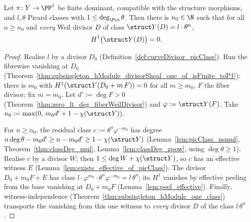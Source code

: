 \begin{theorem}
  \label{thm:flv_class_form}
  \leanok
  Let \(\pi \colon Y \to \PP^1\) be finite dominant, compatible with the structure
  morphisms, and \(l, \theta\) Picard classes with \(1 \le \deg_{\Pic}\theta\). Then there
  is \(n_0 \in \N\) such that for all \(n \ge n_0\) and \emph{every} Weil divisor \(D\) of
  class \(\struct Y(D) = l \cdot \theta^{n}\),
  \[
    H^1\bigl(\struct Y(D)\bigr) = 0 .
  \]
\end{theorem}
\begin{proof}
  \leanok
  Realise \(l\) by a divisor \(D_0\) (Definition~\ref{def:curveDivisor_picClass}). Run the
  fibrewise vanishing at \(D_0\)
  (Theorem~\ref{thm:subsingleton_hModule_divisorSheaf_one_of_isFinite_toP1}): there is
  \(m_0\) with \(H^1(\struct Y(D_0 + m\,F)) = 0\) for all \(m \ge m_0\), \(F\) the fiber
  divisor; fix \(m = m_0\). Let \(d' := \deg F > 0\)
  (Theorem~\ref{thm:zero_lt_deg_fiberWeilDivisor}) and \(\varphi := \struct Y(F)\). Take
  \(n_0 := \max(0,\, m_0 d' + 1 - \chi(\struct Y))\).

  For \(n \ge n_0\), the residual class \(c := \theta^{n}\varphi^{-m_0}\) has degree
  \(n \deg\theta - m_0 d' \ge n - m_0 d' \ge 1 - \chi(\struct Y)\)
  (Lemma~\ref{lem:picClass_nsmul}, Theorem~\ref{thm:classDeg_mul},
  Lemma~\ref{lem:classDeg_zpow}, using \(\deg\theta \ge 1\)). Realise \(c\) by a divisor
  \(W\); then \(1 \le \deg W + \chi(\struct Y)\), so \(c\) has an effective witness \(E\)
  (Lemma~\ref{lem:exists_effective_of_picClass}). The divisor \(D_0 + m_0 F + E\) has class
  \(l \cdot \varphi^{m_0} \cdot \theta^{n}\varphi^{-m_0} = l\,\theta^{n}\); its \(H^1\)
  vanishes by effective peeling from the base vanishing at \(D_0 + m_0 F\)
  (Lemma~\ref{lem:peel_effective}). Finally, witness-independence
  (Theorem~\ref{thm:subsingleton_hModule_one_class}) transports the vanishing from this one
  witness to \emph{every} divisor \(D\) of the class \(l\,\theta^{n}\).
\end{proof}

